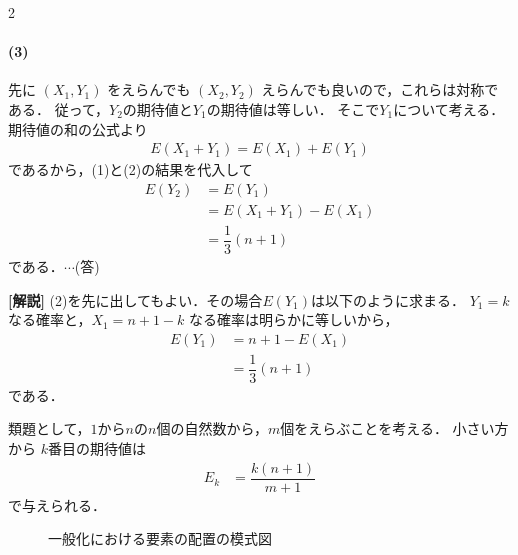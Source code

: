 \documentclass[../../main.tex]{subfiles}
\begin{document}
\begin{multicols}{2}
  \paragraph{(3)}
  先に $(X_1, Y_1)$ をえらんでも $(X_2, Y_2)$ えらんでも良いので，これらは対称である．
  従って，$Y_2$の期待値と$Y_1$の期待値は等しい．
  そこで$Y_1$について考える．
  期待値の和の公式より
  \begin{align}
    E(X_1+Y_1) = E(X_1) + E(Y_1)
  \end{align}
  であるから，(1)と(2)の結果を代入して
  \begin{align}
    E(Y_2)
    & = E(Y_1) \\
    & = E(X_1+Y_1)- E(X_1) \\
    & = \dfrac{1}{3}(n+1)
  \end{align}
  である．$\cdots$(答)

  {\bf [解説]}
  (2)を先に出してもよい．その場合$E(Y_1)$は以下のように求まる．
  $Y_1=k$ なる確率と，$X_1=n+1-k$ なる確率は明らかに等しいから，
  \begin{align}
    E(Y_1)
    & = n+1 - E(X_1)     \\
    & = \dfrac{1}{3}(n+1)
  \end{align}
  である．

  類題として，$1$から$n$の$n$個の自然数から，$m$個をえらぶことを考える．
  小さい方から $k$番目の期待値は
  \begin{align}
    E_k & = \dfrac{k(n+1)}{m+1}
  \end{align}
  で与えられる．

  \begin{figure}[H]
    \centering
    \caption{一般化における要素の配置の模式図}
    \label{1991-5:fig:2}
  \end{figure}


\end{multicols}
\end{document}
